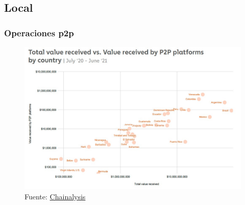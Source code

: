 \subsection{Local}

\begin{frame}
\frametitle{Operaciones p2p}

    \begin{figure}
    \centering
        \includegraphics[width=1\textwidth]{images/C1/arg/arg_demanda (3).jpg}
        \vspace{-5mm}
        \caption*{Fuente: \href{https://blog.chainalysis.com/reports/2021-global-crypto-adoption-index/}{Chainalysis}}
        \end{figure}

\end{frame}